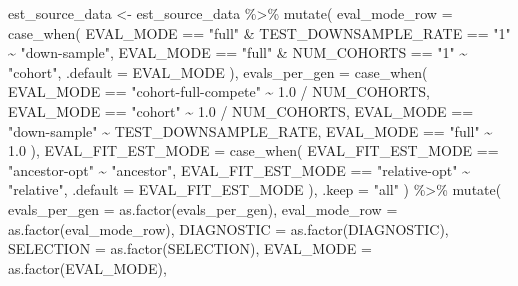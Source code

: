 \documentclass[
]{book}
\newenvironment{Shaded}{\begin{snugshade}}{\end{snugshade}}
\newcommand{\AttributeTok}[1]{\textcolor[rgb]{0.77,0.63,0.00}{#1}}
\newcommand{\FloatTok}[1]{\textcolor[rgb]{0.00,0.00,0.81}{#1}}
\newcommand{\FunctionTok}[1]{\textcolor[rgb]{0.00,0.00,0.00}{#1}}
\newcommand{\NormalTok}[1]{#1}
\newcommand{\OtherTok}[1]{\textcolor[rgb]{0.56,0.35,0.01}{#1}}
\newcommand{\SpecialCharTok}[1]{\textcolor[rgb]{0.00,0.00,0.00}{#1}}
\newcommand{\StringTok}[1]{\textcolor[rgb]{0.31,0.60,0.02}{#1}}
\begin{document}
\begin{Shaded}
\begin{Highlighting}[]
\NormalTok{est\_source\_data }\OtherTok{\textless{}{-}}\NormalTok{ est\_source\_data }\SpecialCharTok{\%\textgreater{}\%}
  \FunctionTok{mutate}\NormalTok{(}
    \AttributeTok{eval\_mode\_row =} \FunctionTok{case\_when}\NormalTok{(}
\NormalTok{      EVAL\_MODE }\SpecialCharTok{==} \StringTok{"full"} \SpecialCharTok{\&}\NormalTok{ TEST\_DOWNSAMPLE\_RATE }\SpecialCharTok{==} \StringTok{"1"} \SpecialCharTok{\textasciitilde{}} \StringTok{"down{-}sample"}\NormalTok{,}
\NormalTok{      EVAL\_MODE }\SpecialCharTok{==} \StringTok{"full"} \SpecialCharTok{\&}\NormalTok{ NUM\_COHORTS }\SpecialCharTok{==} \StringTok{"1"} \SpecialCharTok{\textasciitilde{}} \StringTok{"cohort"}\NormalTok{,}
      \AttributeTok{.default =}\NormalTok{ EVAL\_MODE}
\NormalTok{    ),}
    \AttributeTok{evals\_per\_gen =} \FunctionTok{case\_when}\NormalTok{(}
\NormalTok{      EVAL\_MODE }\SpecialCharTok{==} \StringTok{"cohort{-}full{-}compete"} \SpecialCharTok{\textasciitilde{}} \FloatTok{1.0} \SpecialCharTok{/}\NormalTok{ NUM\_COHORTS,}
\NormalTok{      EVAL\_MODE }\SpecialCharTok{==} \StringTok{"cohort"} \SpecialCharTok{\textasciitilde{}} \FloatTok{1.0} \SpecialCharTok{/}\NormalTok{ NUM\_COHORTS,}
\NormalTok{      EVAL\_MODE }\SpecialCharTok{==} \StringTok{"down{-}sample"} \SpecialCharTok{\textasciitilde{}}\NormalTok{ TEST\_DOWNSAMPLE\_RATE,}
\NormalTok{      EVAL\_MODE }\SpecialCharTok{==} \StringTok{"full"} \SpecialCharTok{\textasciitilde{}} \FloatTok{1.0}
\NormalTok{    ),}
    \AttributeTok{EVAL\_FIT\_EST\_MODE =} \FunctionTok{case\_when}\NormalTok{(}
\NormalTok{      EVAL\_FIT\_EST\_MODE }\SpecialCharTok{==} \StringTok{"ancestor{-}opt"} \SpecialCharTok{\textasciitilde{}} \StringTok{"ancestor"}\NormalTok{,}
\NormalTok{      EVAL\_FIT\_EST\_MODE }\SpecialCharTok{==} \StringTok{"relative{-}opt"} \SpecialCharTok{\textasciitilde{}} \StringTok{"relative"}\NormalTok{,}
      \AttributeTok{.default =}\NormalTok{ EVAL\_FIT\_EST\_MODE}
\NormalTok{    ),}
    \AttributeTok{.keep =} \StringTok{"all"}
\NormalTok{  ) }\SpecialCharTok{\%\textgreater{}\%}
  \FunctionTok{mutate}\NormalTok{(}
    \AttributeTok{evals\_per\_gen =} \FunctionTok{as.factor}\NormalTok{(evals\_per\_gen),}
    \AttributeTok{eval\_mode\_row =} \FunctionTok{as.factor}\NormalTok{(eval\_mode\_row),}
    \AttributeTok{DIAGNOSTIC =} \FunctionTok{as.factor}\NormalTok{(DIAGNOSTIC),}
    \AttributeTok{SELECTION =} \FunctionTok{as.factor}\NormalTok{(SELECTION),}
    \AttributeTok{EVAL\_MODE =} \FunctionTok{as.factor}\NormalTok{(EVAL\_MODE),}

\end{Highlighting}
\end{Shaded}
\end{document}
